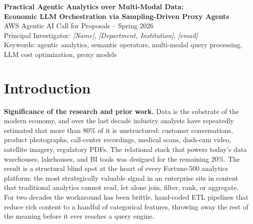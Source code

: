 \documentclass[11pt]{article}
\begin{document}
\begin{center}
{\Large\bfseries Practical Agentic Analytics over Multi-Modal Data:\\
Economic LLM Orchestration via Sampling-Driven Proxy Agents}\\[3pt]
{\small AWS Agentic AI Call for Proposals -- Spring 2026}\\[2pt]
{\small Principal Investigator: \textit{[Name]}, \textit{[Department, Institution]}, \textit{[email]}}\\[1pt]
{\small Keywords: agentic analytics, semantic operators, multi-modal query processing, LLM cost optimization, proxy models}
\end{center}

\vspace{-0.3em}

\section{Introduction}

\noindent\textbf{Significance of the research and prior work.}
Data is the substrate of the modern economy, and over the last decade industry analysts have repeatedly estimated that more than 80\% of it is unstructured: customer conversations, product photographs, call-center recordings, medical scans, dash-cam video, satellite imagery, regulatory PDFs. The relational stack that powers today's data warehouses, lakehouses, and BI tools was designed for the remaining 20\%. The result is a structural blind spot at the heart of every Fortune-500 analytics platform: the most strategically valuable signal in an enterprise sits in content that traditional analytics cannot read, let alone join, filter, rank, or aggregate. For two decades the workaround has been brittle, hand-coded ETL pipelines that reduce rich content to a handful of categorical features, throwing away the rest of the meaning before it ever reaches a query engine.
\end{document}
